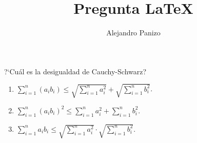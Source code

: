 \documentclass[10pt,spanish,hyperref={pdfpagelabels=false}]{beamer}
\author{Alejandro Panizo}
\title{Pregunta \LaTeX}
\begin{document}
\Large

\rightskip=0pt

\begin{frame}

?`Cu\'{a}l es la desigualdad de Cauchy-Schwarz?

\begin{enumerate}[1.] \rightskip=0pt
\item $\displaystyle{  \sum _{i=1}^n (a_i b_i)\leq \sqrt{\sum _{i=1}^n a_i^2}+ \sqrt{\sum _{i=1}^n b_i^2}}$.
\item $\displaystyle{   \sum _{i=1}^n (a_i b_i)^2\leq \sum _{i=1}^n a_i^2+ \sum _{i=1}^n b_i^2 }$.
\item $\displaystyle{  \sum _{i=1}^n a_i b_i \leq \sqrt{\sum _{i=1}^n a_i^2 } \cdot \sqrt{\sum _{i=1}^n b_i^2} }$.
\end{enumerate}


\end{frame}
\end{document}
